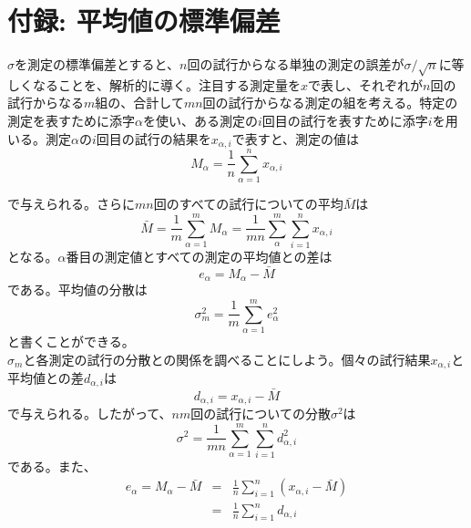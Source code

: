 \documentclass{jsarticle}
\begin{document}
    \section{付録: 平均値の標準偏差}
        $\sigma$を測定の標準偏差とすると、$n$回の試行からなる単独の測定の誤差が$\sigma/\sqrt n$に等しくなることを、解析的に導く。注目する測定量を$x$で表し、それぞれが$n$回の試行からなる$m$組の、合計して$mn$回の試行からなる測定の組を考える。特定の測定を表すために添字$\alpha$を使い、ある測定の$i$回目の試行を表すために添字$i$を用いる。測定$\alpha$の$i$回目の試行の結果を$x_{\alpha, i}$で表すと、測定の値は
        \begin{equation}
            M_{\alpha} = \frac{1}{n}\sum_{\alpha = 1}^{n}x_{\alpha, i}    
        \end{equation}

        で与えられる。さらに$mn$回のすべての試行についての平均$\bar{M}$は
        \begin{equation}            
            \bar{M} = \frac{1}{m}\sum_{\alpha=1}^{m}M_{\alpha} = \frac{1}{mn} \sum_{\alpha}^{m}\sum_{i=1}^{n} x_{\alpha , i}
        \end{equation}
        となる。$\alpha$番目の測定値とすべての測定の平均値との差は
        \begin{equation}           
            e_{\alpha} = M_{\alpha} - \bar{M}
        \end{equation}
        である。平均値の分散は
        \begin{equation}         
        \sigma_{m}^{2} = \frac{1}{m}\sum_{\alpha=1}^{m} e_{\alpha}^{2}
        \label{eq:e3}
        \end{equation}
        と書くことができる。\\
        $\sigma_{m}$と各測定の試行の分散との関係を調べることにしよう。個々の試行結果$x_{\alpha, i}$と平均値との差$d_{\alpha, i}$は
        \begin{equation}       
        d_{\alpha, i} = x_{\alpha, i} - \bar{M}
        \end{equation}
        で与えられる。したがって、$nm$回の試行についての分散$\sigma^{2}$は
        \begin{equation}        
        \sigma^{2} = \frac{1}{mn}\sum_{\alpha = 1}^{m}\sum_{i=1}^{n}d_{\alpha, i}^{2}
        \label{eq:e7}
        \end{equation}
        である。また、
        \begin{eqnarray}
            e_{\alpha} = M_{\alpha} - \bar{M} &=& \frac{1}{n}\sum_{i=1}^{n}(x_{\alpha, i} - \bar{M}) \\
        &=& \frac{1}{n}\sum_{i=1}^{n}d_{\alpha, i}
        \label{eq:e4}
        \end{eqnarray}
\end{document}
